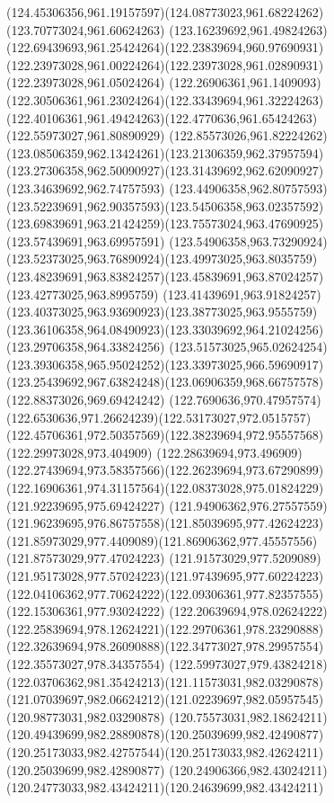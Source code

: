 {{\curveto(124.45306356,961.19157597)(124.08773023,961.68224262)(123.70773024,961.60624263)
\curveto(123.16239692,961.49824263)(122.69439693,961.25424264)(122.23839694,960.97690931)
\curveto(122.23973028,961.00224264)(122.23973028,961.02890931)(122.23973028,961.05024264)
\curveto(122.26906361,961.1409093)(122.30506361,961.23024264)(122.33439694,961.32224263)
\curveto(122.40106361,961.49424263)(122.4770636,961.65424263)(122.55973027,961.80890929)
\curveto(122.85573026,961.82224262)(123.08506359,962.13424261)(123.21306359,962.37957594)
\curveto(123.27306358,962.50090927)(123.31439692,962.62090927)(123.34639692,962.74757593)
\curveto(123.44906358,962.80757593)(123.52239691,962.90357593)(123.54506358,963.02357592)
\curveto(123.69839691,963.21424259)(123.75573024,963.47690925)(123.57439691,963.69957591)
\curveto(123.54906358,963.73290924)(123.52373025,963.76890924)(123.49973025,963.8035759)
\curveto(123.48239691,963.83824257)(123.45839691,963.87024257)(123.42773025,963.8995759)
\curveto(123.41439691,963.91824257)(123.40373025,963.93690923)(123.38773025,963.9555759)
\curveto(123.36106358,964.08490923)(123.33039692,964.21024256)(123.29706358,964.33824256)
\curveto(123.51573025,965.02624254)(123.39306358,965.95024252)(123.33973025,966.59690917)
\curveto(123.25439692,967.63824248)(123.06906359,968.66757578)(122.88373026,969.69424242)
\curveto(122.7690636,970.47957574)(122.6530636,971.26624239)(122.53173027,972.0515757)
\curveto(122.45706361,972.50357569)(122.38239694,972.95557568)(122.29973028,973.404909)
\curveto(122.28639694,973.496909)(122.27439694,973.58357566)(122.26239694,973.67290899)
\curveto(122.16906361,974.31157564)(122.08373028,975.01824229)(121.92239695,975.69424227)
\curveto(121.94906362,976.27557559)(121.96239695,976.86757558)(121.85039695,977.42624223)
\curveto(121.85973029,977.4409089)(121.86906362,977.45557556)(121.87573029,977.47024223)
\curveto(121.91573029,977.5209089)(121.95173028,977.57024223)(121.97439695,977.60224223)
\curveto(122.04106362,977.70624222)(122.09306361,977.82357555)(122.15306361,977.93024222)
\curveto(122.20639694,978.02624222)(122.25839694,978.12624221)(122.29706361,978.23290888)
\curveto(122.32639694,978.26090888)(122.34773027,978.29957554)(122.35573027,978.34357554)
\curveto(122.59973027,979.43824218)(122.03706362,981.35424213)(121.11573031,982.03290878)
\curveto(121.07039697,982.06624212)(121.02239697,982.05957545)(120.98773031,982.03290878)
\curveto(120.75573031,982.18624211)(120.49439699,982.28890878)(120.25039699,982.42490877)
\curveto(120.25173033,982.42757544)(120.25173033,982.42624211)(120.25039699,982.42890877)
\curveto(120.24906366,982.43024211)(120.24773033,982.43424211)(120.24639699,982.43424211)
}}
